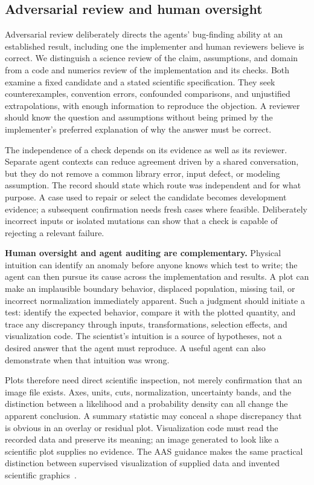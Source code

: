 \documentclass[aps,prd,reprint,nofootinbib]{revtex4-2}
\begin{document}
\subsection{Adversarial review and human oversight}
Adversarial review deliberately directs the agents' bug-finding ability at an established result, including one the implementer and human reviewers believe is correct. We distinguish a science review of the claim, assumptions, and domain from a code and numerics review of the implementation and its checks. Both examine a fixed candidate and a stated scientific specification. They seek counterexamples, convention errors, confounded comparisons, and unjustified extrapolations, with enough information to reproduce the objection. A reviewer should know the question and assumptions without being primed by the implementer's preferred explanation of why the answer must be correct.

The independence of a check depends on its evidence as well as its reviewer. Separate agent contexts can reduce agreement driven by a shared conversation, but they do not remove a common library error, input defect, or modeling assumption. The record should state which route was independent and for what purpose. A case used to repair or select the candidate becomes development evidence; a subsequent confirmation needs fresh cases where feasible. Deliberately incorrect inputs or isolated mutations can show that a check is capable of rejecting a relevant failure.

\textbf{Human oversight and agent auditing are complementary.} Physical intuition can identify an anomaly before anyone knows which test to write; the agent can then pursue its cause across the implementation and results. A plot can make an implausible boundary behavior, displaced population, missing tail, or incorrect normalization immediately apparent. Such a judgment should initiate a test: identify the expected behavior, compare it with the plotted quantity, and trace any discrepancy through inputs, transformations, selection effects, and visualization code. The scientist's intuition is a source of hypotheses, not a desired answer that the agent must reproduce. A useful agent can also demonstrate when that intuition was wrong.

Plots therefore need direct scientific inspection, not merely confirmation that an image file exists. Axes, units, cuts, normalization, uncertainty bands, and the distinction between a likelihood and a probability density can all change the apparent conclusion. A summary statistic may conceal a shape discrepancy that is obvious in an overlay or residual plot. Visualization code must read the recorded data and preserve its meaning; an image generated to look like a scientific plot supplies no evidence. The AAS guidance makes the same practical distinction between supervised visualization of supplied data and invented scientific graphics~\cite{AAS2026}.
\end{document}
